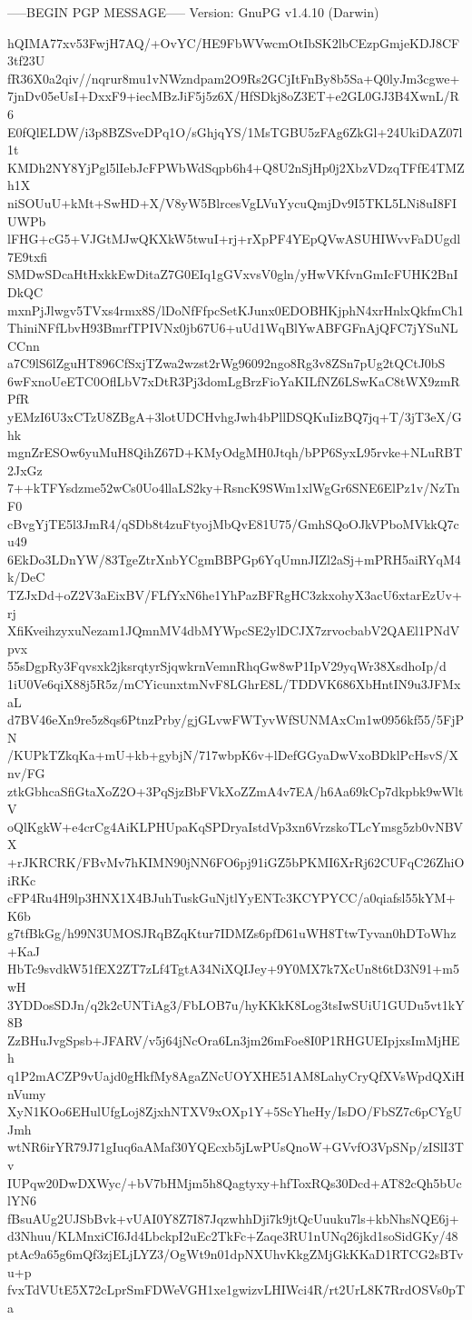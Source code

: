-----BEGIN PGP MESSAGE-----
Version: GnuPG v1.4.10 (Darwin)

hQIMA77xv53FwjH7AQ/+OvYC/HE9FbWVwcmOtIbSK2lbCEzpGmjeKDJ8CF3tf23U
fR36X0a2qiv//nqrur8mu1vNWzndpam2O9Rs2GCjItFnBy8b5Sa+Q0lyJm3cgwe+
7jnDv05eUsI+DxxF9+iecMBzJiF5j5z6X/HfSDkj8oZ3ET+e2GL0GJ3B4XwnL/R6
E0fQlELDW/i3p8BZSveDPq1O/sGhjqYS/1MsTGBU5zFAg6ZkGl+24UkiDAZ07l1t
KMDh2NY8YjPgl5lIebJcFPWbWdSqpb6h4+Q8U2nSjHp0j2XbzVDzqTFfE4TMZh1X
niSOUuU+kMt+SwHD+X/V8yW5BlrcesVgLVuYycuQmjDv9I5TKL5LNi8uI8FIUWPb
lFHG+cG5+VJGtMJwQKXkW5twuI+rj+rXpPF4YEpQVwASUHIWvvFaDUgdl7E9txfi
SMDwSDcaHtHxkkEwDitaZ7G0EIq1gGVxvsV0gln/yHwVKfvnGmIcFUHK2BnIDkQC
mxnPjJlwgv5TVxs4rmx8S/lDoNfFfpcSetKJunx0EDOBHKjphN4xrHnlxQkfmCh1
ThiniNFfLbvH93BmrfTPIVNx0jb67U6+uUd1WqBlYwABFGFnAjQFC7jYSuNLCCnn
a7C9lS6lZguHT896CfSxjTZwa2wzst2rWg96092ngo8Rg3v8ZSn7pUg2tQCtJ0bS
6wFxnoUeETC0OflLbV7xDtR3Pj3domLgBrzFioYaKILfNZ6LSwKaC8tWX9zmRPfR
yEMzI6U3xCTzU8ZBgA+3lotUDCHvhgJwh4bPllDSQKuIizBQ7jq+T/3jT3eX/Ghk
mgnZrESOw6yuMuH8QihZ67D+KMyOdgMH0Jtqh/bPP6SyxL95rvke+NLuRBT2JxGz
7++kTFYsdzme52wCs0Uo4llaLS2ky+RsncK9SWm1xlWgGr6SNE6ElPz1v/NzTnF0
cBvgYjTE5l3JmR4/qSDb8t4zuFtyojMbQvE81U75/GmhSQoOJkVPboMVkkQ7cu49
6EkDo3LDnYW/83TgeZtrXnbYCgmBBPGp6YqUmnJIZl2aSj+mPRH5aiRYqM4k/DeC
TZJxDd+oZ2V3aEixBV/FLfYxN6he1YhPazBFRgHC3zkxohyX3acU6xtarEzUv+rj
XfiKveihzyxuNezam1JQmnMV4dbMYWpcSE2ylDCJX7zrvocbabV2QAEl1PNdVpvx
55sDgpRy3Fqvsxk2jksrqtyrSjqwkrnVemnRhqGw8wP1IpV29yqWr38XsdhoIp/d
1iU0Ve6qiX88j5R5z/mCYicunxtmNvF8LGhrE8L/TDDVK686XbHntIN9u3JFMxaL
d7BV46eXn9re5z8qs6PtnzPrby/gjGLvwFWTyvWfSUNMAxCm1w0956kf55/5FjPN
/KUPkTZkqKa+mU+kb+gybjN/717wbpK6v+lDefGGyaDwVxoBDklPcHsvS/Xnv/FG
ztkGbhcaSfiGtaXoZ2O+3PqSjzBbFVkXoZZmA4v7EA/h6Aa69kCp7dkpbk9wWltV
oQlKgkW+e4crCg4AiKLPHUpaKqSPDryaIstdVp3xn6VrzskoTLcYmsg5zb0vNBVX
+rJKRCRK/FBvMv7hKIMN90jNN6FO6pj91iGZ5bPKMI6XrRj62CUFqC26ZhiOiRKc
cFP4Ru4H9lp3HNX1X4BJuhTuskGuNjtlYyENTc3KCYPYCC/a0qiafsl55kYM+K6b
g7tfBkGg/h99N3UMOSJRqBZqKtur7IDMZs6pfD61uWH8TtwTyvan0hDToWhz+KaJ
HbTc9svdkW51fEX2ZT7zLf4TgtA34NiXQIJey+9Y0MX7k7XcUn8t6tD3N91+m5wH
3YDDosSDJn/q2k2cUNTiAg3/FbLOB7u/hyKKkK8Log3tsIwSUiU1GUDu5vt1kY8B
ZzBHuJvgSpsb+JFARV/v5j64jNcOra6Ln3jm26mFoe8I0P1RHGUEIpjxsImMjHEh
q1P2mACZP9vUajd0gHkfMy8AgaZNcUOYXHE51AM8LahyCryQfXVsWpdQXiHnVumy
XyN1KOo6EHulUfgLoj8ZjxhNTXV9xOXp1Y+5ScYheHy/IsDO/FbSZ7c6pCYgUJmh
wtNR6irYR79J71gIuq6aAMaf30YQEcxb5jLwPUsQnoW+GVvfO3VpSNp/zISlI3Tv
IUPqw20DwDXWyc/+bV7bHMjm5h8Qagtyxy+hfToxRQs30Dcd+AT82cQh5bUclYN6
fBsuAUg2UJSbBvk+vUAI0Y8Z7I87JqzwhhDji7k9jtQcUuuku7ls+kbNhsNQE6j+
d3Nhuu/KLMnxiCI6Jd4LbckpI2uEc2TkFc+Zaqe3RU1nUNq26jkd1soSidGKy/48
ptAc9a65g6mQf3zjELjLYZ3/OgWt9n01dpNXUhvKkgZMjGkKKaD1RTCG2sBTvu+p
fvxTdVUtE5X72cLprSmFDWeVGH1xe1gwizvLHIWci4R/rt2UrL8K7RrdOSVs0pTa
